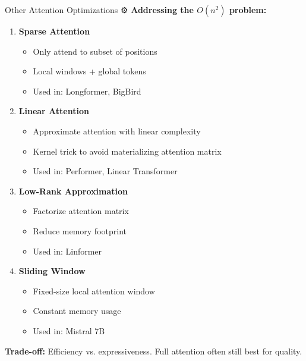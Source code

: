 \documentclass[aspectratio=169]{beamer}
\begin{document}
\begin{frame}[shrink=10]{Other Attention Optimizations ⚙️}
\textbf{Addressing the $O(n^2)$ problem:}

\vspace{1em}

\begin{enumerate}\setlength{\itemsep}{0pt}
    \item \textbf{Sparse Attention}
    \begin{itemize}\setlength{\itemsep}{0pt}
        \item Only attend to subset of positions
        \item Local windows + global tokens
        \item Used in: Longformer, BigBird
    \end{itemize}

    \vspace{0.5em}

    \item \textbf{Linear Attention}
    \begin{itemize}\setlength{\itemsep}{0pt}
        \item Approximate attention with linear complexity
        \item Kernel trick to avoid materializing attention matrix
        \item Used in: Performer, Linear Transformer
    \end{itemize}

    \vspace{0.5em}

    \item \textbf{Low-Rank Approximation}
    \begin{itemize}\setlength{\itemsep}{0pt}
        \item Factorize attention matrix
        \item Reduce memory footprint
        \item Used in: Linformer
    \end{itemize}

    \vspace{0.5em}

    \item \textbf{Sliding Window}
    \begin{itemize}\setlength{\itemsep}{0pt}
        \item Fixed-size local attention window
        \item Constant memory usage
        \item Used in: Mistral 7B
    \end{itemize}
\end{enumerate}

\vspace{0.5em}
\textbf{Trade-off:} Efficiency vs. expressiveness. Full attention often still best for quality.
\end{frame}
\end{document}
